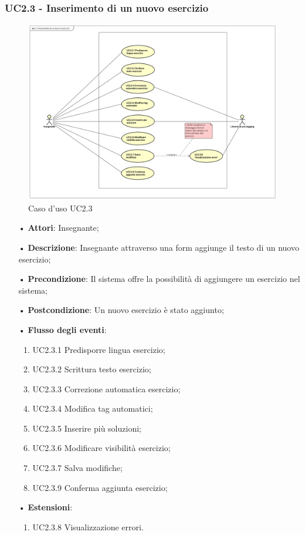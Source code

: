\subsubsection{UC2.3 - Inserimento di un nuovo esercizio}

\begin{figure}[H]
	\centering
	\includegraphics[width=18cm]{img/UC23.png} 
	\caption{Caso d'uso UC2.3}
\end{figure}

\begin{itemize}
	\item[•] \textbf{Attori}: Insegnante;
	\item[•] \textbf{Descrizione}: Insegnante attraverso una form aggiunge il testo di un nuovo esercizio;
	\item[•] \textbf{Precondizione}: Il sistema offre la possibilità di aggiungere un esercizio nel sistema;
	\item[•] \textbf{Postcondizione}: Un nuovo esercizio è stato aggiunto;
	\item[•] \textbf{Flusso degli eventi}:
	\begin{enumerate}
		\item UC2.3.1 Predisporre lingua esercizio;
		\item UC2.3.2 Scrittura testo esercizio;
		\item UC2.3.3 Correzione automatica esercizio;
		\item UC2.3.4 Modifica tag automatici;
		\item UC2.3.5 Inserire più soluzioni;
		\item UC2.3.6 Modificare visibilità esercizio;
		\item UC2.3.7 Salva modifiche;
		\item UC2.3.9 Conferma aggiunta esercizio;
	\end{enumerate}
	\item[•] \textbf{Estensioni}:	
	\begin{enumerate}
		\item UC2.3.8 Visualizzazione errori.
	\end{enumerate}
\end{itemize}

